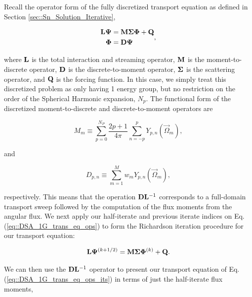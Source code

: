 Recall the operator form of the fully discretized transport equation as defined in Section \ref{sec::Sn_Solution_Iterative},

\begin{equation}
\label{eq::DSA_1G_trans_eq_ops}
\begin{aligned}
{\bf L} {\bf \Psi} &= {\bf M} {\bf \Sigma} {\bf \Phi}  +    {\bf Q} \\
{\bf \Phi} &=  {\bf D} {\bf \Psi}
\end{aligned},
\end{equation}

\noindent where ${\bf L}$ is the total interaction and streaming operator, ${\bf M}$ is the moment-to-discrete operator, ${\bf D}$ is the discrete-to-moment operator, ${\bf \Sigma}$ is the scattering operator, and ${\bf Q}$ is the forcing function. In this case, we simply treat this discretized problem as only having 1 energy group, but no restriction on the order of the Spherical Harmonic expansion, $N_p$. The functional form of the discretized moment-to-discrete and discrete-to-moment operators are

\begin{equation}
\label{eq::DSA_1G_M}
M_{m} \equiv \sum_{p=0}^{N_P} \frac{2p + 1}{4 \pi}   \sum_{n=-p}^{p}  Y_{p,n} (  \vec{\Omega}_m )   ,
\end{equation}

\noindent and 

\begin{equation}
\label{eq::DSA_1G_D}
D_{p,n} \equiv \sum_{m=1}^M w_m Y_{p,n} (\vec{\Omega}_m) ,
\end{equation}

\noindent respectively. This means that the operation ${\bf D} {\bf L}^{-1}$ corresponds to a full-domain transport sweep followed by the computation of the flux moments from the angular flux. We next apply our half-iterate and previous iterate indices on Eq. (\ref{eq::DSA_1G_trans_eq_ops}) to form the Richardson iteration procedure for our transport equation:

\begin{equation}
\label{eq::DSA_1G_trans_eq_ops_its}
{\bf L} {\bf \Psi}^{(k+1/2)}= {\bf M} {\bf \Sigma} {\bf \Phi}^{(k)}  +    {\bf Q} .
\end{equation}

\noindent We can then use the ${\bf D} {\bf L}^{-1}$ operator to present our transport equation of Eq. (\ref{eq::DSA_1G_trans_eq_ops_its}) in terms of just the half-iterate flux moments,

